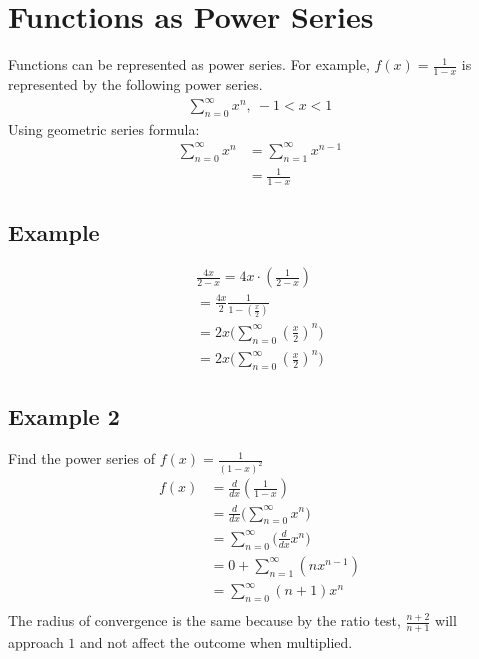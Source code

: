 \documentclass{article}
\theoremstyle{mytheoremstyle}
\theoremstyle{mytheoremstyle}
\theoremstyle{myproblemstyle}
\begin{document}
    \section*{Functions as Power Series}
    Functions can be represented as power series. For example,
    $f(x)=\frac{1}{1-x}$ is represented by the following power series.
    \begin{align*}
        \sum_{n=0}^{\infty} x^n,\ -1 < x < 1
    \end{align*}
    Using geometric series formula:
    \begin{align*}
        \sum_{n=0}^{\infty} x^n
        &= \sum_{n=1}^{\infty} x^{n-1} \\
        &= \frac{1}{1-x}
    \end{align*}

    \subsection*{Example}
    \begin{align*}
        \frac{4x}{2-x} = 4x \cdot (\frac{1}{2-x}) \\
        = \frac{4x}{2} \frac{1}{1-(\frac{x}{2})} \\
        = 2x \Big(\sum_{n=0}^{\infty} (\frac{x}{2})^n\Big) \\
        = 2x \Big(\sum_{n=0}^{\infty} (\frac{x}{2})^n\Big)
    \end{align*}

    \subsection*{Example 2}
    Find the power series of $f(x) = \frac{1}{(1-x)^2}$
    \begin{align*}
        f(x) &= \frac{d}{dx} (\frac{1}{1-x}) \\
        &= \frac{d}{dx} \Big(\sum_{n=0}^{\infty} x^n\Big) \\
        &= \sum_{n=0}^{\infty} \Big(\frac{d}{dx} x^n\Big) \\
        &= 0 + \sum_{n=1}^{\infty} (nx^{n-1}) \\
        &= \sum_{n=0}^{\infty} (n+1)x^{n} \\
    \end{align*}
    The radius of convergence is the same because by the ratio test, $\frac{n+2}{n+1}$
    will approach $1$ and not affect the outcome when multiplied.
\end{document}
